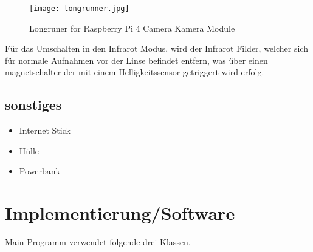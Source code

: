\begin{figure}[H]
    \centering
    \texttt{[image: longrunner.jpg]}
    \caption{Longruner for Raspberry Pi 4 Camera Kamera Module}
    \label{fig:rpicam}
\end{figure}

Für das Umschalten in den Infrarot Modus, wird der Infrarot Filder, welcher sich 
für normale Aufnahmen vor der Linse befindet entfern, was über einen magnetschalter 
der mit einem Helligkeitssensor getriggert wird erfolg.

 

\subsection*{sonstiges}
\begin{itemize}
    \item Internet Stick%
    \item Hülle
    \item Powerbank
\end{itemize}

\section{Implementierung/Software}

Main Programm verwendet folgende drei Klassen.

% 

%         
%     
%     


%


\vspace{1cm}






